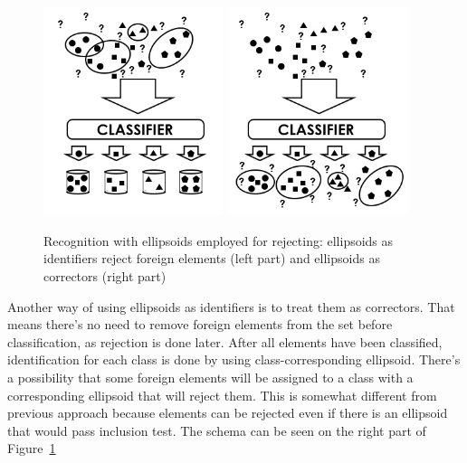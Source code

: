 \documentclass{llncs}
\begin{document}
\begin{figure}[!h]
  \centering
  \includegraphics[width=0.47\textwidth]{_Figures/Classification1.jpg}\hspace{12pt}
	\includegraphics[width=0.47\textwidth]{_Figures/Classification2.jpg}
  \caption{Recognition with ellipsoids employed for rejecting: ellipsoids as identifiers reject foreign elements (left part) and ellipsoids as correctors (right part)}
\label{fig:nativeforeignpatternsClassification1}
\end{figure}

Another way of using ellipsoids as identifiers is to treat them as correctors. That means there's no need to remove foreign elements from the set before classification, as rejection is done later. After all elements have been classified, identification for each class is done by using class-corresponding ellipsoid. There's a possibility that some foreign elements will be assigned to a class with a corresponding ellipsoid that will reject them. This is somewhat different from previous approach because elements can be rejected even if there is an ellipsoid that would pass inclusion test. The schema can be seen on the right part of Figure~\ref{fig:nativeforeignpatternsClassification1}
\end{document}

